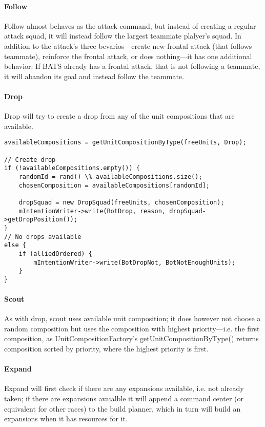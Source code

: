 \paragraph{Follow}
Follow almost behaves as the attack command, but instead of creating a regular attack squad, it will instead follow the largest teammate plalyer’s squad. In addition to the attack’s three bevarios—create new frontal attack (that follows teammate), reinforce the frontal attack, or does nothing—it has one additional behavior: If BATS already has a frontal attack, that is not following a teammate, it will abandon its goal and instead follow the teammate.

\paragraph{Drop}
Drop will try to create a drop from any of the unit compositions that are available.
\begin{lstlisting}[label={lst:order_drop},caption={Pseudo-code for the drop command}]
availableCompositions = getUnitCompositionByType(freeUnits, Drop);

// Create drop
if (!availableCompositions.empty()) {
	randomId = rand() \% availableCompositions.size();
	chosenComposition = availableCompositions[randomId];

	dropSquad = new DropSquad(freeUnits, chosenComposition);
	mIntentionWriter->write(BotDrop, reason, dropSquad->getDropPosition());
}
// No drops available
else {
	if (alliedOrdered) {
		mIntentionWriter->write(BotDropNot, BotNotEnoughUnits);
	}
}
\end{lstlisting}

\paragraph{Scout}
As with drop, scout uses available unit composition; it does however not choose a random composition but uses the composition with highest priority—i.e. the first composition, as UnitCompositionFactory’s getUnitCompositionByType() returns composition sorted by priority, where the highest priority is first.

\paragraph{Expand}
Expand will first check if there are any expansions available, i.e. not already taken; if there are expansions avaialble it will append a command center (or equivalent for other races) to the build planner, which in turn will build an expansions when it has resources for it.

